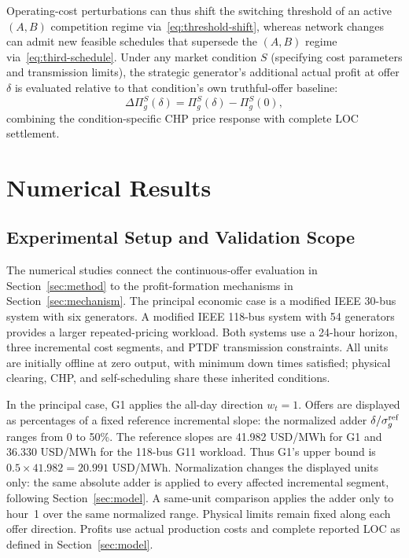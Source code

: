 \documentclass[journal]{IEEEtran}
\begin{document}
Operating-cost perturbations can thus shift the switching threshold of an active $(A,B)$ competition regime via~\eqref{eq:threshold-shift}, whereas network changes can admit new feasible schedules that supersede the $(A,B)$ regime via~\eqref{eq:third-schedule}. Under any market condition $S$ (specifying cost parameters and transmission limits), the strategic generator's additional actual profit at offer $\delta$ is evaluated relative to that condition's own truthful-offer baseline:
\begin{equation}
\Delta\Pi_g^S(\delta) = \Pi_g^S(\delta) - \Pi_g^S(0),\label{eq:condition-profit}
\end{equation}
combining the condition-specific CHP price response with complete LOC settlement.









\section{Numerical Results}\label{sec:results}
\subsection{Experimental Setup and Validation Scope}
The numerical studies connect the continuous-offer evaluation in Section~\ref{sec:method} to the profit-formation mechanisms in Section~\ref{sec:mechanism}. The principal economic case is a modified IEEE 30-bus system with six generators. A modified IEEE 118-bus system with 54 generators provides a larger repeated-pricing workload. Both systems use a 24-hour horizon, three incremental cost segments, and PTDF transmission constraints. All units are initially offline at zero output, with minimum down times satisfied; physical clearing, CHP, and self-scheduling share these inherited conditions.

In the principal case, G1 applies the all-day direction $w_t=1$. Offers are displayed as percentages of a fixed reference incremental slope: the normalized adder $\delta/\sigma_g^{\rm ref}$ ranges from 0 to 50\%. The reference slopes are 41.982 USD/MWh for G1 and 36.330 USD/MWh for the 118-bus G11 workload. Thus G1's upper bound is $0.5\times41.982=20.991$ USD/MWh. Normalization changes the displayed units only: the same absolute adder is applied to every affected incremental segment, following Section~\ref{sec:model}. A same-unit comparison applies the adder only to hour~1 over the same normalized range. Physical limits remain fixed along each offer direction. Profits use actual production costs and complete reported LOC as defined in Section~\ref{sec:model}.
\end{document}
